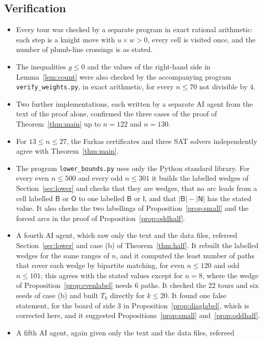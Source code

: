 \documentclass[11pt]{amsart}
\theoremstyle{remark}
\begin{document}
\subsection*{Verification}
\begin{itemize}
\item Every tour was checked by a separate program in exact rational arithmetic: each step is a knight move with
$u\times w>0$, every cell is visited once, and the number of plumb-line crossings is as stated.
\item The inequalities $g\le0$ and the values of the right-hand side in Lemma~\ref{lem:count} were also checked by
the accompanying program \texttt{verify\_weights.py}, in exact arithmetic, for every $n\le70$ not divisible by $4$.
\item Two further implementations, each written by a separate AI agent from the text of the proof alone, confirmed
the three cases of the proof of Theorem~\ref{thm:main} up to $n=122$ and $n=130$.
\item For $13\le n\le27$, the Farkas certificates and three SAT solvers independently agree with
Theorem~\ref{thm:main}.
\item The program \texttt{lower\_bounds.py} uses only the Python standard library. For every even $n\le500$ and
every odd $n\le301$ it builds the labelled wedges of Section~\ref{sec:lower} and checks that they are wedges, that no
arc leads from a cell labelled $\mathsf B$ or $\mathsf O$ to one labelled $\mathsf B$ or $\mathsf I$, and that
$|\mathsf B|-|\mathsf N|$ has the stated value. It also checks the two labellings of Proposition~\ref{prop:small}
and the forced arcs in the proof of Proposition~\ref{prop:oddhalf}.
\item A fourth AI agent, which saw only the text and the data files, refereed Section~\ref{sec:lower} and case (b)
of Theorem~\ref{thm:half}. It rebuilt the labelled wedges for the same ranges of $n$, and it computed the least
number of paths that cover each wedge by bipartite matching, for even $n\le120$ and odd $n\le101$; this agrees with
the stated values except for $n=8$, where the wedge of Proposition~\ref{prop:evenlabel} needs $6$ paths. It checked
the $22$ tours and six seeds of case (b) and built $T_k$ directly for $k\le20$. It found one false statement, for
the board of side $3$ in Proposition~\ref{prop:diaglabel}, which is corrected here, and it suggested
Propositions~\ref{prop:small} and~\ref{prop:oddhalf}.
\item A fifth AI agent, again given only the text and the data files, refereed

\end{itemize}
\end{document}
